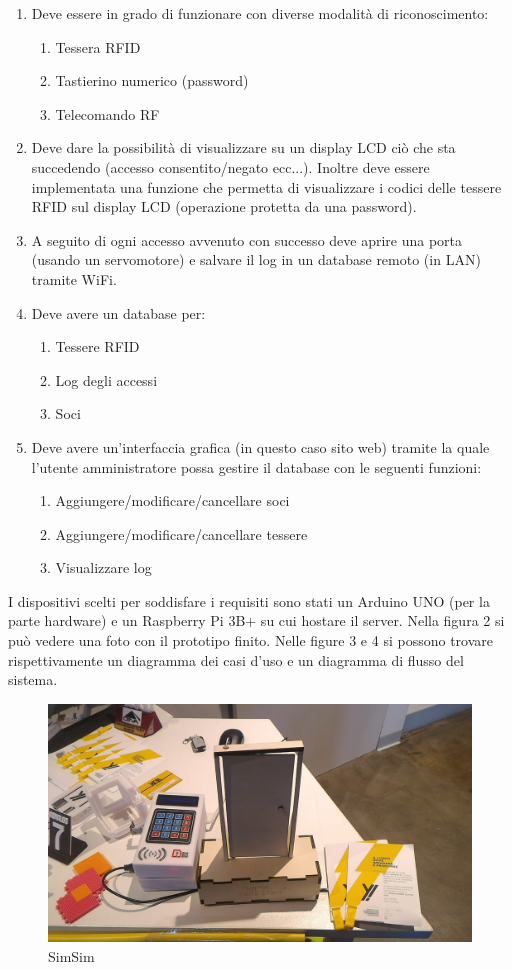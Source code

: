 \documentclass[12pt]{report}
\begin{document}
\begin{enumerate}
	\item Deve essere in grado di funzionare con diverse modalità di riconoscimento:
	\begin{enumerate}
		\item Tessera RFID
		\item Tastierino numerico (password)
		\item Telecomando RF 
	\end{enumerate}
	\item Deve dare la possibilità di visualizzare su un display LCD ciò che sta succedendo (accesso consentito/negato ecc...). Inoltre deve essere implementata una funzione che permetta di visualizzare i codici delle tessere RFID sul display LCD (operazione protetta da una password).
	\item A seguito di ogni accesso avvenuto con successo deve aprire una porta (usando un servomotore) e salvare il log in un database remoto (in LAN) tramite WiFi.
	\item Deve avere un database per:
	\begin{enumerate}
		\item Tessere RFID
		\item Log degli accessi
		\item Soci
	\end{enumerate}
	\item Deve avere un'interfaccia grafica (in questo caso sito web) tramite la quale l'utente amministratore possa gestire il database con le seguenti funzioni: \begin{enumerate}
		\item Aggiungere/modificare/cancellare soci 
		\item Aggiungere/modificare/cancellare tessere 
		\item Visualizzare log
	\end{enumerate}
\end{enumerate}

I dispositivi scelti per soddisfare i requisiti sono stati un Arduino UNO (per la parte hardware) e un Raspberry Pi 3B+ su cui hostare il server. 
Nella figura 2 si può vedere una foto con il prototipo finito.
Nelle figure 3 e 4 si possono trovare rispettivamente un diagramma dei casi d'uso e un diagramma di flusso del sistema.


\begin{figure}
	\includegraphics[width=1\linewidth]{./img/simsim.jpeg}
	\caption{SimSim}
	\label{fig:flux}
\end{figure}
\end{document}

